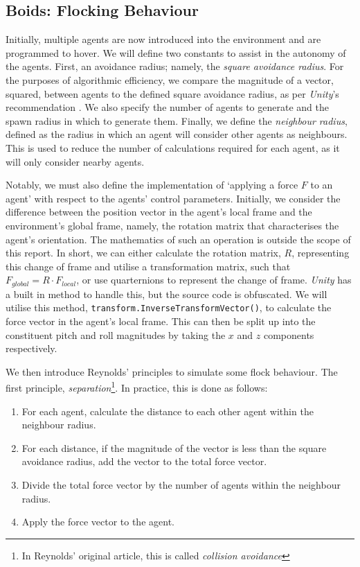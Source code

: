 \documentclass{article}
\begin{document}
\subsection{Boids: Flocking Behaviour}

Initially, multiple agents are now introduced into the environment and are programmed to hover. We will define two constants to assist in the autonomy of the agents. First, an avoidance radius; namely, the \emph{square avoidance radius}. For the purposes of algorithmic efficiency, we compare the magnitude of a vector, squared, between agents to the defined square avoidance radius, as per \emph{Unity}'s recommendation \cite{unity}. We also specify the number of agents to generate and the spawn radius in which to generate them. Finally, we define the \emph{neighbour radius}, defined as the radius in which an agent will consider other agents as neighbours. This is used to reduce the number of calculations required for each agent, as it will only consider nearby agents.

Notably, we must also define the implementation of `applying a force $F$ to an agent' with respect to the agents' control parameters. Initially, we consider the difference between the position vector in the agent's local frame and the environment's global frame, namely, the rotation matrix that characterises the agent's orientation. The mathematics of such an operation is outside the scope of this report. In short, we can either calculate the rotation matrix, $R$, representing this change of frame and utilise a transformation matrix, such that $F_{global} = R \cdot F_{local}$, or use quarternions to represent the change of frame. \emph{Unity} has a built in method to handle this, but the source code is obfuscated. We will utilise this method, \verb|transform.InverseTransformVector()|, to calculate the force vector in the agent's local frame. This can then be split up into the constituent pitch and roll magnitudes by taking the $x$ and $z$ components respectively.

We then introduce Reynolds' principles \cite{Reynolds} to simulate some flock behaviour. The first principle, \emph{separation}\footnote{In Reynolds' original article, this is called \emph{collision avoidance}}. In practice, this is done as follows:

\begin{enumerate}
    \item For each agent, calculate the distance to each other agent within the neighbour radius.
    \item For each distance, if the magnitude of the vector is less than the square avoidance radius, add the vector to the total force vector.
    \item Divide the total force vector by the number of agents within the neighbour radius.
    \item Apply the force vector to the agent.
\end{enumerate}
\end{document}
